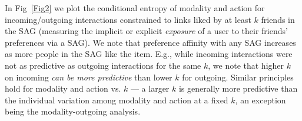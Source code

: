 In Fig~\ref{Fig2} we plot the conditional entropy of modality and
action for incoming/outgoing interactions constrained to links liked
by at least $k$ friends in the SAG
 (measuring the implicit or explicit
 \emph{exposure} of a user to their friends' preferences via a SAG).
We note that preference affinity with any SAG increases as more people
in the SAG like the item.  E.g., while incoming interactions were not
as predictive as outgoing interactions for the same $k$, we note that
higher $k$ on incoming \emph{can be more predictive} than lower $k$
for outgoing.  Similar principles hold for modality and action vs. $k$
--- a larger $k$ is generally more predictive than the individual
variation among modality and action at a fixed $k$, an exception being
the modality-outgoing analysis.


